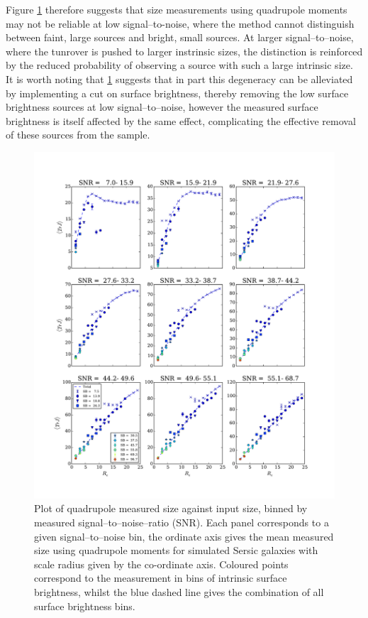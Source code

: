 \documentclass[useAMS,usenatbib,times,letter,amssymb]{mn2e}
\begin{document}
Figure \ref{Fig:SSNRCalib} therefore suggests that size measurements using quadrupole moments may not be reliable at low signal--to-noise, where the method cannot distinguish between faint, large sources and bright, small sources. At larger signal--to--noise, where the tunrover is pushed to larger instrinsic sizes, the distinction is reinforced by the reduced probability of observing a source with such a large intrinsic size. It is worth noting that \ref{Fig:SSNRCalib} suggests that in part this degeneracy can be alleviated by implementing a cut on surface brightness, thereby removing the low surface brightness sources at low signal--to--noise, however the measured surface brightness is itself affected by the same effect, complicating the effective removal of these sources from the sample.

\begin{figure}
\centering
\includegraphics[width = \textwidth]{Figures/Calibration_Plots/17April2015/Size_Distributions/Calibrations/SSNR/SSNR_Calibration_ImSim_TrJ_wSB.pdf}
\caption{Plot of quadrupole measured size against input size, binned by measured signal--to--noise--ratio (SNR). Each panel corresponds to a given signal--to--noise bin, the ordinate axis gives the mean measured size using quadrupole moments for simulated Sersic galaxies with scale radius given by the co-ordinate axis. Coloured points correspond to the measurement in bins of intrinsic surface brightness, whilst the blue dashed line gives the combination of all surface brightness bins.}\label{Fig:SSNRCalib}
\end{figure}
\end{document}
